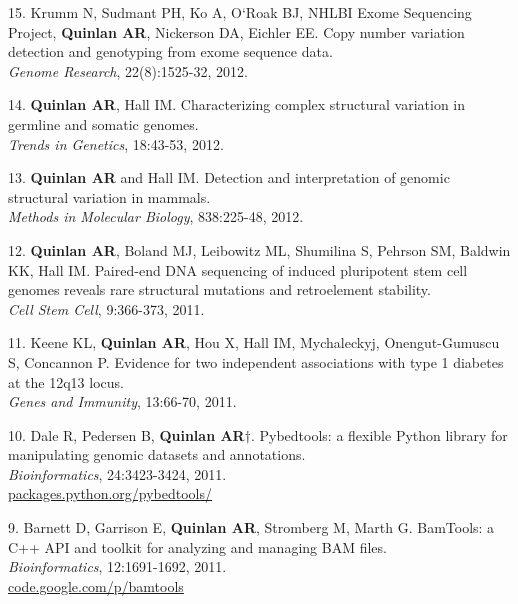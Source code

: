 \documentclass[margin,line]{cv}
\begin{document}
\begin{resume}
\begin{list}{*}{}
    \item[15.] Krumm N, Sudmant PH, Ko A, O`Roak BJ, NHLBI Exome Sequencing Project, 
    \textbf{Quinlan AR}, Nickerson DA, Eichler EE. 
    Copy number variation detection and genotyping from exome sequence data.\\
    \textit{Genome Research}, 22(8):1525-32, 2012.

    \item[14.] \textbf{Quinlan AR}, Hall IM. 
    Characterizing complex structural variation in germline and somatic genomes.\\
    \textit{Trends in Genetics}, 18:43-53, 2012.

    \item[13.] \textbf{Quinlan AR} and Hall IM. 
    Detection and interpretation of genomic structural variation in mammals.\\
    \textit{Methods in Molecular Biology}, 838:225-48, 2012.
   
    \item[12.] \textbf{Quinlan AR}, Boland MJ, Leibowitz ML, Shumilina S, Pehrson SM, Baldwin KK, Hall IM. 
    Paired-end DNA sequencing of induced pluripotent stem cell genomes reveals 
    rare structural mutations and retroelement stability.\\
    \textit{Cell Stem Cell}, 9:366-373, 2011.
    
    \item[11.] Keene KL, \textbf{Quinlan AR}, Hou X, Hall IM, Mychaleckyj, Onengut-Gumuscu S, Concannon P.
    Evidence for two independent associations with type 1 diabetes at the 12q13 locus.\\
    \textit{Genes and Immunity}, 13:66-70, 2011.

    \item[10.] Dale R, Pedersen B, \textbf{Quinlan AR}$\dagger$. 
    Pybedtools: a flexible Python library for manipulating genomic datasets and annotations.\\
    \textit{Bioinformatics}, 24:3423-3424, 2011.\\
    \url{packages.python.org/pybedtools/}
    
    \item[9.] Barnett D, Garrison E, \textbf{Quinlan AR}, Stromberg M, Marth G.
    BamTools: a C++ API and toolkit for analyzing and managing BAM files.\\
    \textit{Bioinformatics}, 12:1691-1692, 2011.\\
    \url{code.google.com/p/bamtools}


\end{list}
\end{resume}
\end{document}
